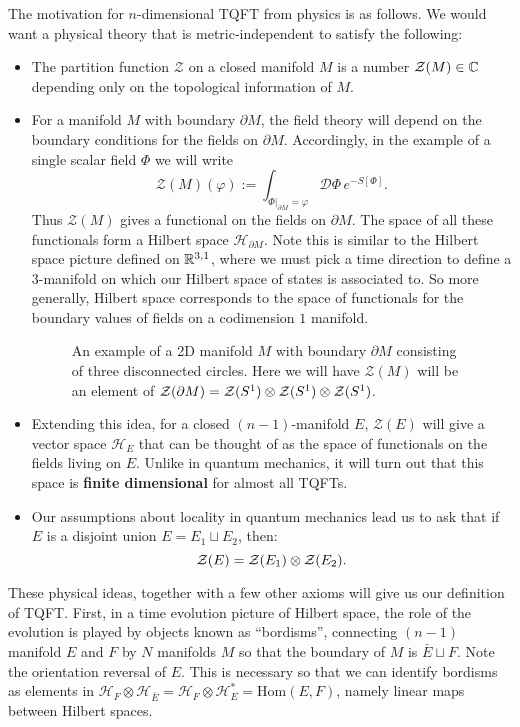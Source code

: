 	
	The motivation for $n$-dimensional TQFT from physics is as follows. We would want a physical theory that is metric-independent to satisfy the following: 
	\begin{itemize}
		\item The partition function $\mathcal Z$ on a closed manifold $M$ is a number $\mathcal Z(M) \in \mathbb{C}$ depending only on the topological information of $M$.
		\item For a manifold $M$ with boundary $\partial M$, the field theory will depend on the boundary conditions for the fields on $\partial M$. Accordingly, in the example of a single scalar field $\Phi$ we will write
		\[
			\mathcal Z(M) (\varphi) := \int_{\Phi|_{\partial M} = \varphi} \mathcal D \Phi\, e^{- S[\Phi]}.
		\]
		Thus $\mathcal Z(M)$ gives a functional on the fields on $\partial M$. The space of all these functionals form a Hilbert space $\mathcal H_{\partial M}$. Note this is similar to the Hilbert space picture defined on $\mathbb{R}^{3,1}$, where we must pick a time direction to define a $3$-manifold on which our Hilbert space of states is associated to. So more generally, Hilbert space corresponds to the space of functionals for the boundary values of fields on a codimension $1$ manifold.
		\begin{figure}
			\centering
			\caption{An example of a 2D manifold $M$ with boundary $\partial M$ consisting of three disconnected circles. Here we will have $\mathcal Z(M)$ will be an element of $\mathcal Z(\partial M) = \mathcal{Z}(S^1) \otimes \mathcal{Z}(S^1) \otimes \mathcal{Z}(S^1)$.}
			\label{fig:tqft1}
		\end{figure}
		\item Extending this idea, for a closed $(n-1)$-manifold $E$, $\mathcal Z(E)$ will give a vector space $\mathcal H_E$ that can be thought of as the space of functionals on the fields living on $E$. Unlike in quantum mechanics, it will turn out that this space is \textbf{finite dimensional} for almost all TQFTs.
		\item Our assumptions about locality in quantum mechanics lead us to ask that if $E$ is a disjoint union $E = E_1 \sqcup E_2$, then:
		\[
			\mathcal{Z}(E) = \mathcal{Z}(E_1) \otimes \mathcal{Z}(E_2).
		\]
	\end{itemize}
	These physical ideas, together with a few other axioms will give us our definition of TQFT. First, in a time evolution picture of Hilbert space, the role of the evolution is played by objects known as ``bordisms'', connecting $(n-1)$ manifold $E$ and $F$ by $N$ manifolds $M$ so that the boundary of $M$ is $\bar E \sqcup F$. Note the orientation reversal of $E$. This is necessary so that we can identify bordisms as elements in $\mathcal H_{F} \otimes \mathcal H_{\bar E} = \mathcal H_{F} \otimes \mathcal H_E^*  = \mathrm{Hom}(E, F)$, namely linear maps between Hilbert spaces.

